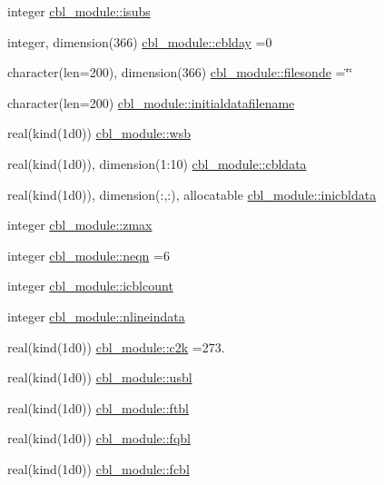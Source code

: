 \begin{DoxyCompactItemize}
\item 
integer \hyperlink{namespacecbl__module_a0140016345794a8912c00aafaf50fe1e}{cbl\+\_\+module\+::isubs}
\item 
integer, dimension(366) \hyperlink{namespacecbl__module_a5901bc487fe54be32f04988c42ab7443}{cbl\+\_\+module\+::cblday} =0
\item 
character(len=200), dimension(366) \hyperlink{namespacecbl__module_a810011542edd41ab403379b2004c84ab}{cbl\+\_\+module\+::filesonde} =\char`\"{}\char`\"{}
\item 
character(len=200) \hyperlink{namespacecbl__module_add8682c29dcc92f528e2894dd1e16f39}{cbl\+\_\+module\+::initialdatafilename}
\item 
real(kind(1d0)) \hyperlink{namespacecbl__module_acdfa6106091fdfa93a6cab25af3d0f1a}{cbl\+\_\+module\+::wsb}
\item 
real(kind(1d0)), dimension(1\+:10) \hyperlink{namespacecbl__module_aae12ee171bb6806332a07b9300284693}{cbl\+\_\+module\+::cbldata}
\item 
real(kind(1d0)), dimension(\+:,\+:), allocatable \hyperlink{namespacecbl__module_ae82d92a08db006da8495afa687a74c6c}{cbl\+\_\+module\+::inicbldata}
\item 
integer \hyperlink{namespacecbl__module_ad6ee0356644a1bc5acc13c4dc71ad4f9}{cbl\+\_\+module\+::zmax}
\item 
integer \hyperlink{namespacecbl__module_a52c76c9e4368adec7890e95932374f73}{cbl\+\_\+module\+::neqn} =6
\item 
integer \hyperlink{namespacecbl__module_a105bb269b58c37d9b6170f7aa3a74fbe}{cbl\+\_\+module\+::icblcount}
\item 
integer \hyperlink{namespacecbl__module_a5f768f5aae74fa7b0c2d66118fc71ba5}{cbl\+\_\+module\+::nlineindata}
\item 
real(kind(1d0)) \hyperlink{namespacecbl__module_a295b5b9a6a2d8808cba5c386dd4ed2e6}{cbl\+\_\+module\+::c2k} =273.
\item 
real(kind(1d0)) \hyperlink{namespacecbl__module_ac165fc78c97d6f5f81b06c8282165aa0}{cbl\+\_\+module\+::usbl}
\item 
real(kind(1d0)) \hyperlink{namespacecbl__module_a9096ed1c586fe2526affe44bdc6a3506}{cbl\+\_\+module\+::ftbl}
\item 
real(kind(1d0)) \hyperlink{namespacecbl__module_a976e376b24178298356c3ffba35082f8}{cbl\+\_\+module\+::fqbl}
\item 
real(kind(1d0)) \hyperlink{namespacecbl__module_abece0fd4503899af7cb75b51be8b5e63}{cbl\+\_\+module\+::fcbl}

\end{DoxyCompactItemize}
